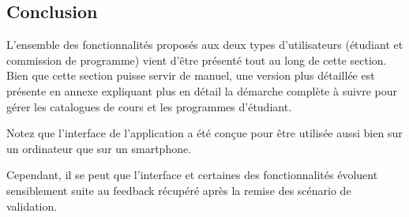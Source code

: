 \subsection{Conclusion}
L'ensemble des fonctionnalités proposés aux deux types d'utilisateurs (étudiant et commission de programme) vient d'être présenté tout au long de cette section. Bien que cette section puisse servir de manuel, une version plus détaillée est présente en annexe expliquant plus en détail la démarche complète à suivre pour gérer les catalogues de cours et les programmes d'étudiant.

Notez que l'interface de l'application a été conçue pour être utilisée aussi bien sur un ordinateur que sur un smartphone. 

Cependant, il se peut que l'interface et certaines des fonctionnalités évoluent sensiblement suite au feedback récupéré après la remise des scénario de validation. 






